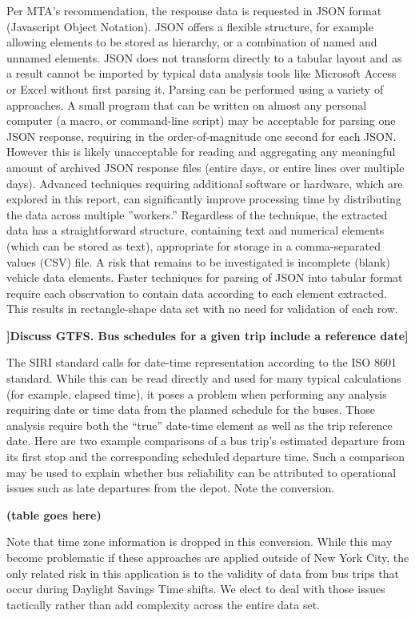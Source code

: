 \documentclass[12pt]{report}
\begin{document}
Per MTA's recommendation, the response data is requested in JSON format (Javascript Object Notation).  JSON offers a flexible structure, for example allowing elements to be stored as hierarchy, or a combination of named and unnamed elements.  JSON does not transform directly to a tabular layout and as a result cannot be imported by typical data analysis tools like Microsoft Access or Excel without first parsing it.
Parsing can be performed using a variety of approaches.  A small program that can be written on almost any personal computer (a macro, or command-line script) may be acceptable for parsing one JSON response, requiring in the order-of-magnitude one second for each JSON.  However this is likely unacceptable for reading and aggregating any meaningful amount of archived JSON response files (entire days, or entire lines over multiple days).  Advanced techniques requiring additional software or hardware, which are explored in this report, can significantly improve processing time by distributing the data across multiple ''workers.''  Regardless of the technique, the extracted data has a straightforward structure, containing text and numerical elements (which can be stored as text), appropriate for storage in a comma-separated values (CSV) file.
A risk that remains to be investigated is incomplete (blank) vehicle data elements.  Faster techniques for parsing of JSON into tabular format require each observation to contain data according to each element extracted.  This results in rectangle-shape data set with no need for validation of each row.

\textbf{]Discuss GTFS. Bus schedules for a given trip include a reference date]}

The SIRI standard calls for date-time representation according to the ISO 8601 standard.  While this can be read directly and used for many typical calculations (for example, elapsed time), it poses a problem when performing any analysis requiring date or time data from the planned schedule for the buses.  Those analysis require both the “true'' date-time element as well as the trip reference date.  Here are two example comparisons of a bus trip's estimated departure from its first stop and the corresponding scheduled departure time. Such a comparison may be used to explain whether bus reliability can be attributed to operational issues such as late departures from the depot.  Note the conversion.

\textbf{(table goes here)}

Note that time zone information is dropped in this conversion.  While this may become problematic if these approaches are applied outside of New York City, the only related risk in this application is to the validity of data from bus trips that occur during Daylight Savings Time shifts.  We elect to deal with those issues tactically rather than add complexity across the entire data set.
\end{document}

